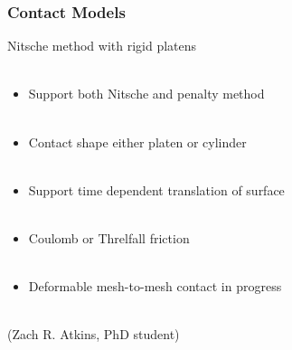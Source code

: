 \documentclass{beamer}
\begin{document}
\begin{frame}
\begin{center}
\frametitle{Contact Models}

Nitsche method with rigid platens\\

~\\

\begin{itemize}

\item Support both Nitsche and penalty method\\

~\\

\item Contact shape either platen or cylinder\\

~\\

\item Support time dependent translation of surface\\

~\\

\item Coulomb or Threlfall friction\\

~\\

\item Deformable mesh-to-mesh contact in progress\\

\end{itemize}

~\\

(Zach R. Atkins, PhD student)

\end{center}
\end{frame}

\end{document}
